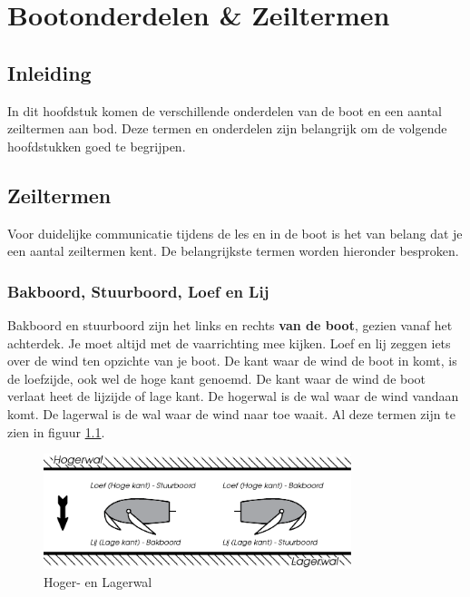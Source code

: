 \chapter{Bootonderdelen \& Zeiltermen}
\section{Inleiding}
In dit hoofdstuk komen de verschillende onderdelen van de boot en een aantal zeiltermen aan bod. Deze termen en onderdelen zijn belangrijk om de volgende hoofdstukken goed te begrijpen.

\section{Zeiltermen}
Voor duidelijke communicatie tijdens de les en in de boot is het van belang dat je een aantal zeiltermen kent. De belangrijkste termen worden hieronder besproken.

\subsection{Bakboord, Stuurboord, Loef en Lij}
Bakboord en stuurboord zijn het links en rechts \textbf{van de boot}, gezien vanaf het achterdek. Je moet altijd met de vaarrichting mee kijken. Loef en lij zeggen iets over de wind ten opzichte van je boot. De kant waar de wind de boot in komt, is de loefzijde, ook wel de hoge kant genoemd. De kant waar de wind de boot verlaat heet de lijzijde of lage kant. De hogerwal is de wal waar de wind vandaan komt. De lagerwal is de wal waar de wind naar toe waait. Al deze termen zijn te zien in figuur \ref{pic:hoog_laag}. 
\begin{figure}[ht]
	\centering
	\includegraphics[width=0.8\textwidth]{Hoofdstukken/Onderdelen/pdf/wallen.pdf}
	\caption{Hoger- en Lagerwal}
	\centering
	\label{pic:hoog_laag}
\end{figure}

